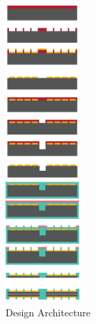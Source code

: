 \documentclass[12pt]{article}
\numberwithin{equation}{section}
\numberwithin{table}{section}
\numberwithin{figure}{section}
\begin{document}
\begin{figure} \centering
  \includegraphics[width=0.25\textwidth]{DesignArchitecture.png}
  \caption{Design Architecture}
  \label{DesignArchitecture}
\end{figure}




\end{document}

